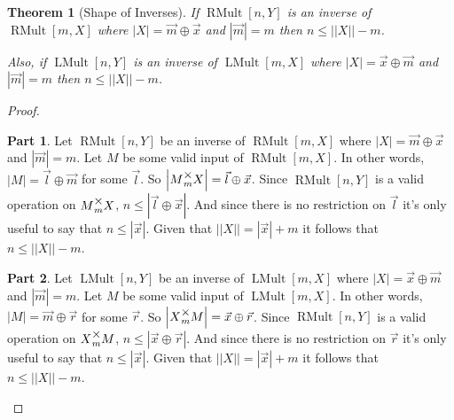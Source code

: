 \documentclass[12pt]{book}
\theoremstyle{plain}
\newtheorem{theorem}{Theorem}[chapter]
\theoremstyle{definition}
\theoremstyle{ppart}
\newtheorem{ppart}{Part}
\theoremstyle{case}
\theoremstyle{solution}
\DeclareMathOperator{\RMult}{RMult}
\DeclareMathOperator{\LMult}{LMult}
\newcommand{\mmult}[1]{\text{\raisebox{1ex}{$\underset{#1}{\times}$}}}
\newcommand{\shape}[1]{\left|#1\right|}
\begin{document}
\begin{theorem}[Shape of Inverses]
If $\RMult[n,Y]$ is an inverse of $\RMult[m,X]$ where $\shape{X} = \vec{m} \oplus \vec{x}$ and
$\shape{\vec{m}} = m$ then $n \le \shape{\shape{X}}-m$.

Also, if $\LMult[n,Y]$ is an inverse of $\LMult[m,X]$ where $\shape{X} = \vec{x} \oplus \vec{m}$ and
$\shape{\vec{m}} = m$ then $n \le \shape{\shape{X}}-m$.
\end{theorem}
\begin{proof}
\begin{ppart}
Let $\RMult[n,Y]$ be an inverse of $\RMult[m,X]$ where $\shape{X} = \vec{m} \oplus \vec{x}$ and
$\shape{\vec{m}} = m$.
Let $M$ be some valid input of $\RMult[m,X]$.
In other words, $\shape{M} = \vec{l} \oplus \vec{m}$ for some $\vec{l}$.
So $\shape{M \mmult{m} X} = \vec{l} \oplus \vec{x}$.
Since $\RMult[n,Y]$ is a valid operation on $M \mmult{m} X$, $n \le \shape{\vec{l} \oplus \vec{x}}$.
And since there is no restriction on $\vec{l}$ it's only useful to say that $n \le \shape{\vec{x}}$.
Given that $\shape{\shape{X}} = \shape{\vec{x}} + m$ it follows that $n \le \shape{\shape{X}} - m$.
\end{ppart}
\begin{ppart}
Let $\LMult[n,Y]$ be an inverse of $\LMult[m,X]$ where $\shape{X} = \vec{x} \oplus \vec{m}$ and
$\shape{\vec{m}} = m$.
Let $M$ be some valid input of $\LMult[m,X]$.
In other words, $\shape{M} = \vec{m} \oplus \vec{r}$ for some $\vec{r}$.
So $\shape{X \mmult{m} M} = \vec{x} \oplus \vec{r}$.
Since $\RMult[n,Y]$ is a valid operation on $X \mmult{m} M$, $n \le \shape{\vec{x} \oplus \vec{r}}$.
And since there is no restriction on $\vec{r}$ it's only useful to say that $n \le \shape{\vec{x}}$.
Given that $\shape{\shape{X}} = \shape{\vec{x}} + m$ it follows that $n \le \shape{\shape{X}} - m$.
\end{ppart}
\end{proof}
\end{document}
